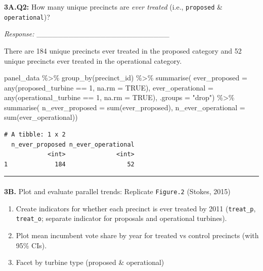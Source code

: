\documentclass[
  letterpaper,
  DIV=11,
  numbers=noendperiod]{scrartcl}
\makeatletter
\let\oldparagraph\paragraph
\renewcommand{\paragraph}{
    \@ifstar
      \xxxParagraphStar
      \xxxParagraphNoStar
  }
\newcommand{\xxxParagraphStar}[1]{\oldparagraph*{#1}\mbox{}}
\newcommand{\xxxParagraphNoStar}[1]{\oldparagraph{#1}\mbox{}}
\newenvironment{Shaded}{\begin{snugshade}}{\end{snugshade}}
\newcommand{\AttributeTok}[1]{\textcolor[rgb]{0.40,0.45,0.13}{#1}}
\newcommand{\ConstantTok}[1]{\textcolor[rgb]{0.56,0.35,0.01}{#1}}
\newcommand{\DecValTok}[1]{\textcolor[rgb]{0.68,0.00,0.00}{#1}}
\newcommand{\FunctionTok}[1]{\textcolor[rgb]{0.28,0.35,0.67}{#1}}
\newcommand{\NormalTok}[1]{\textcolor[rgb]{0.00,0.23,0.31}{#1}}
\newcommand{\SpecialCharTok}[1]{\textcolor[rgb]{0.37,0.37,0.37}{#1}}
\newcommand{\StringTok}[1]{\textcolor[rgb]{0.13,0.47,0.30}{#1}}
\providecommand{\tightlist}{%
  \setlength{\itemsep}{0pt}\setlength{\parskip}{0pt}}
\makeatother
\begin{document}
\textbf{3A.Q2:} How many unique precincts are \emph{ever treated} (i.e.,
\texttt{proposed} \& \texttt{operational})?

\emph{Response:} \_\_\_\_\_\_\_\_\_\_\_\_\_\_\_\_\_\_\_\_\_\_\_\_\_

There are 184 unique precincts ever treated in the proposed category and
52 unique precincts ever treated in the operational category.

\begin{Shaded}
\begin{Highlighting}[]
\NormalTok{panel\_data }\SpecialCharTok{\%\textgreater{}\%}
  \FunctionTok{group\_by}\NormalTok{(precinct\_id) }\SpecialCharTok{\%\textgreater{}\%}
  \FunctionTok{summarise}\NormalTok{(}
    \AttributeTok{ever\_proposed    =} \FunctionTok{any}\NormalTok{(proposed\_turbine }\SpecialCharTok{==} \DecValTok{1}\NormalTok{, }\AttributeTok{na.rm =} \ConstantTok{TRUE}\NormalTok{),}
    \AttributeTok{ever\_operational =} \FunctionTok{any}\NormalTok{(operational\_turbine }\SpecialCharTok{==} \DecValTok{1}\NormalTok{, }\AttributeTok{na.rm =} \ConstantTok{TRUE}\NormalTok{),}
    \AttributeTok{.groups =} \StringTok{"drop"}\NormalTok{) }\SpecialCharTok{\%\textgreater{}\%}
  \FunctionTok{summarise}\NormalTok{(}
    \AttributeTok{n\_ever\_proposed    =} \FunctionTok{sum}\NormalTok{(ever\_proposed),}
    \AttributeTok{n\_ever\_operational =} \FunctionTok{sum}\NormalTok{(ever\_operational))}
\end{Highlighting}
\end{Shaded}

\begin{verbatim}
# A tibble: 1 x 2
  n_ever_proposed n_ever_operational
            <int>              <int>
1             184                 52
\end{verbatim}

\begin{center}\rule{0.5\linewidth}{0.5pt}\end{center}

\paragraph{\texorpdfstring{\textbf{3B.} Plot and evaluate parallel
trends: Replicate \texttt{Figure.2} (Stokes,
2015)}{3B. Plot and evaluate parallel trends: Replicate Figure.2 (Stokes, 2015)}}\label{b.-plot-and-evaluate-parallel-trends-replicate-figure.2-stokes-2015}

\begin{enumerate}
\def\labelenumi{\arabic{enumi}.}
\tightlist
\item
  Create indicators for whether each precinct is ever treated by 2011
  (\texttt{treat\_p}, \texttt{treat\_o}; separate indicator for
  proposals and operational turbines).
\item
  Plot mean incumbent vote share by year for treated vs control
  precincts (with 95\% CIs).
\item
  Facet by turbine type (proposed \& operational)
\end{enumerate}
\end{document}
